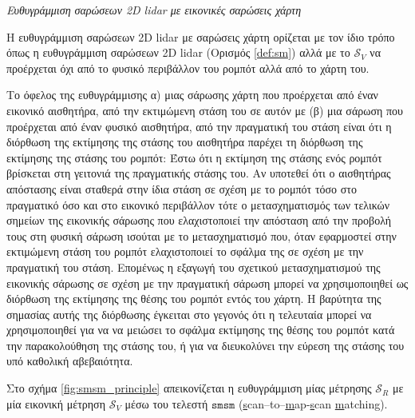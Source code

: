 \begin{bw_box}
\begin{definition}
\label{def:smsm}
\textit{Ευθυγράμμιση σαρώσεων 2D lidar με εικονικές σαρώσεις χάρτη}

Η ευθυγράμμιση σαρώσεων 2D lidar με σαρώσεις χάρτη ορίζεται με τον ίδιο τρόπο
όπως η ευθυγράμμιση σαρώσεων 2D lidar (Ορισμός \ref{def:sm}) αλλά με το
$\mathcal{S}_V$ να προέρχεται όχι από το φυσικό περιβάλλον του ρομπότ αλλά
από το χάρτη του.
\end{definition}
\end{bw_box}


\begin{gg_box}
\begin{remark}
\label{remark:smsm_benefit}
Το όφελος της ευθυγράμμισης α) μιας σάρωσης χάρτη που προέρχεται από έναν
εικονικό αισθητήρα, από την εκτιμώμενη στάση του σε αυτόν με (β) μια σάρωση
που προέρχεται από έναν φυσικό αισθητήρα, από την πραγματική του στάση είναι
ότι η διόρθωση της εκτίμησης της στάσης του αισθητήρα παρέχει τη διόρθωση της
εκτίμησης της στάσης του ρομπότ: Έστω ότι η εκτίμηση της στάσης ενός ρομπότ
βρίσκεται στη γειτονιά της πραγματικής στάσης του. Αν υποτεθεί ότι ο
αισθητήρας απόστασης είναι σταθερά στην ίδια στάση σε σχέση με το ρομπότ τόσο
στο πραγματικό όσο και στο εικονικό περιβάλλον τότε ο μετασχηματισμός των
τελικών σημείων της εικονικής σάρωσης που ελαχιστοποιεί την απόσταση από την
προβολή τους στη φυσική σάρωση ισούται με το μετασχηματισμό που, όταν
εφαρμοστεί στην εκτιμώμενη στάση του ρομπότ ελαχιστοποιεί το σφάλμα της σε
σχέση με την πραγματική του στάση. Επομένως η εξαγωγή του σχετικού
μετασχηματισμού της εικονικής σάρωσης σε σχέση με την πραγματική σάρωση
μπορεί να χρησιμοποιηθεί ως διόρθωση της εκτίμησης της θέσης του ρομπότ εντός
του χάρτη. Η βαρύτητα της σημασίας αυτής της διόρθωσης έγκειται στο γεγονός
ότι η τελευταία μπορεί να χρησιμοποιηθεί για να να μειώσει το σφάλμα
εκτίμησης της θέσης του ρομπότ κατά την παρακολούθηση της στάσης του, ή για
να διευκολύνει την εύρεση της στάσης του υπό καθολική αβεβαιότητα.
\end{remark}
\end{gg_box}


Στο σχήμα \ref{fig:smsm_principle} απεικονίζεται η ευθυγράμμιση μίας μέτρησης
$\mathcal{S}_R$ με μία εικονική μέτρηση $\mathcal{S}_V$ μέσω του τελεστή
$\texttt{smsm}$ (\underline{s}can--to--\underline{m}ap-\underline{s}can
\underline{m}atching).


